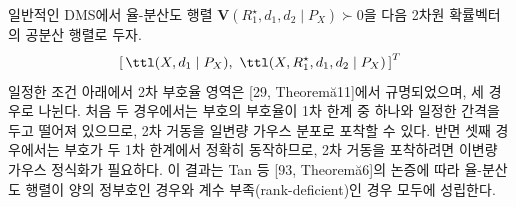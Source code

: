 일반적인 DMS에서 율-분산도 행렬 $\mathbf{V}(R_1^\star,d_1,d_2\mid P_X)\succ 0$을 다음 2차원 확률벡터의 공분산 행렬로 두자.
\[
  \left[\,\ttl(X,d_1\mid P_X),\ \ttl(X,R_1^\star,d_1,d_2\mid P_X)\,\right]^T
\]
일정한 조건 아래에서 2차 부호율 영역은 [29, Theoremă11]에서 규명되었으며, 세 경우로 나뉜다.
처음 두 경우에서는 부호의 부호율이 1차 한계 중 하나와 일정한 간격을 두고 떨어져 있으므로, 2차 거동을 일변량 가우스 분포로 포착할 수 있다.
반면 셋째 경우에서는 부호가 두 1차 한계에서 정확히 동작하므로, 2차 거동을 포착하려면 이변량 가우스 정식화가 필요하다.
이 결과는 Tan 등 [93, Theoremă6]의 논증에 따라 율-분산도 행렬이 양의 정부호인 경우와 계수 부족(rank-deficient)인 경우 모두에 성립한다.
